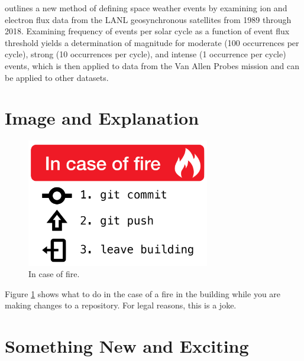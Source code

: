 \documentclass[12pt, letterpaper]{article}
\begin{document}
\noindent \citet[]{Reeves2020} outlines a new method of defining space weather events by examining ion and electron flux data from the LANL geosynchronous satellites from 1989 through 2018. Examining frequency of events per solar cycle as a function of event flux threshold yields a determination of magnitude for moderate (100 occurrences per cycle), strong (10 occurrences per cycle), and intense (1 occurrence per cycle) events, which is then applied to data from the Van Allen Probes mission and can be applied to other datasets.

\section{Image and Explanation}


\begin{figure}[!ht]
  \centering
  \includegraphics[width=8cm]{meme.png}
  \caption{In case of fire.}
  \label{fig:meme}
\end{figure}

Figure \ref{fig:meme} shows what to do in the case of a fire in the building while you are making changes to a repository. For legal reasons, this is a joke.


\section{Something New and Exciting}

\end{document}
